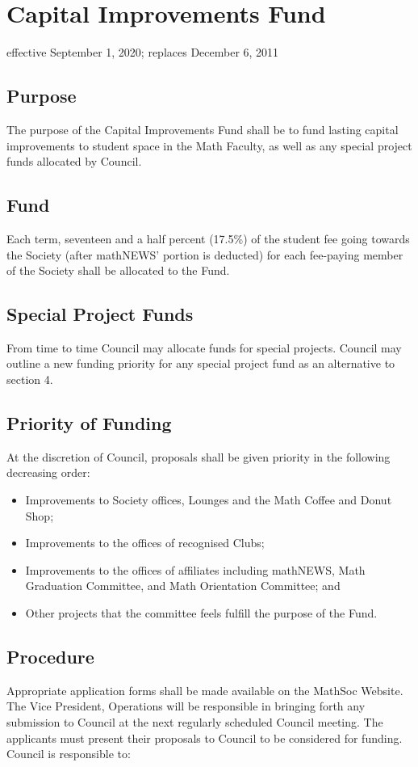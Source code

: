 \section{Capital Improvements Fund}
effective September 1, 2020; replaces December 6, 2011

\subsection{Purpose}
The purpose of the Capital Improvements Fund shall be to fund lasting capital improvements to student space in the Math Faculty, as well as any special project funds allocated by Council.

\subsection{Fund}
Each term, seventeen and a half percent (17.5\%) of the student fee going towards the 
Society (after mathNEWS' portion is deducted) for each fee-paying member of the 
Society shall be allocated to the Fund.

\subsection{Special Project Funds}
From time to time Council may allocate funds for special projects. Council may outline a new funding priority for any special project fund as an alternative to section 4.

\subsection{Priority of Funding}
At the discretion of Council, proposals shall be given priority in the following decreasing order:\
\begin{itemize}
\item Improvements to Society offices, Lounges and the Math Coffee and Donut Shop;
\item Improvements to the offices of recognised Clubs;
\item Improvements to the offices of affiliates including mathNEWS, Math Graduation Committee, and Math Orientation Committee; and
\item Other projects that the committee feels fulfill the purpose of the Fund.
\end{itemize}

\subsection{Procedure}
Appropriate application forms shall be made available on the MathSoc Website. The Vice
President, Operations will be responsible in bringing forth any submission to Council 
at the next regularly scheduled Council meeting. The applicants must present their 
proposals to Council to be considered for funding. Council is responsible to:

